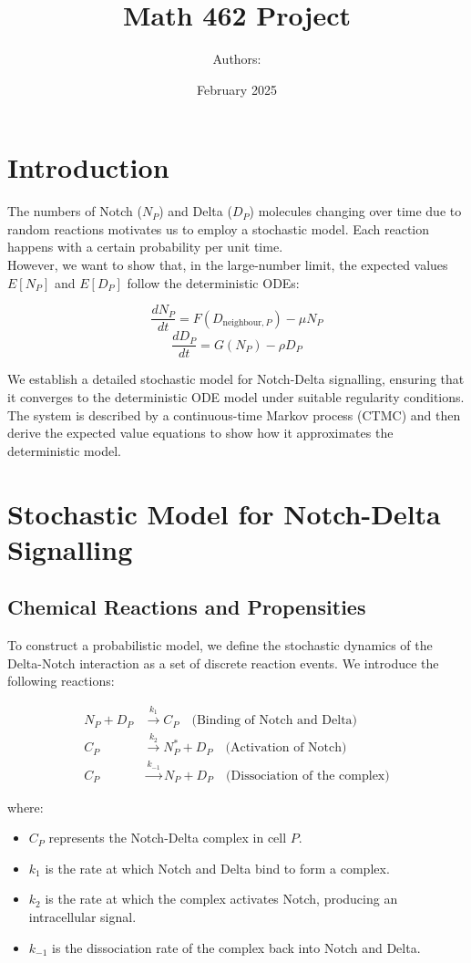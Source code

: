 \documentclass{article}
\title{Math 462 Project}
\author{Authors:}
\date{February 2025}
\begin{document}
\maketitle

\section{Introduction}
The numbers of Notch (\(N_P\)) and Delta (\(D_P\)) molecules changing over time due to random reactions motivates us to employ a stochastic model. Each reaction happens with a certain probability per unit time. \\ 
However, we want to show that, in the large-number limit, the expected values \(E[N_P]\) and \(E[D_P]\) follow the deterministic ODEs:

\[
\frac{dN_P}{dt} = F(D_{\text{neighbour},P}) - \mu N_P
\]
\[
\frac{dD_P}{dt} = G(N_P) - \rho D_P
\]

\hfill

We establish a detailed stochastic model for Notch-Delta signalling, ensuring that it converges to the deterministic ODE model under suitable regularity conditions. The system is described by a continuous-time Markov process (CTMC) and then derive the expected value equations to show how it approximates the deterministic model.

\section{Stochastic Model for Notch-Delta Signalling}
\subsection{Chemical Reactions and Propensities}
To construct a probabilistic model, we define the stochastic dynamics of the Delta-Notch interaction as a set of discrete reaction events. We introduce the following reactions:

\begin{align*}
  N_{P} + D_{P} &\xrightarrow{k_1} C_{P} \quad \text{(Binding of Notch and Delta)} \\
  C_{P} &\xrightarrow{k_2} N_{P}^{*} + D_{P} \quad \text{(Activation of Notch)} \\
  C_{P} &\xrightarrow{k_{-1}} N_{P} + D_{P} \quad \text{(Dissociation of the complex)}
\end{align*}

where:

\begin{itemize}
  \item $C_{P}$ represents the Notch-Delta complex in cell $P$.
  \item $k_1$ is the rate at which Notch and Delta bind to form a complex.
  \item $k_2$ is the rate at which the complex activates Notch, producing an intracellular signal.
  \item $k_{-1}$ is the dissociation rate of the complex back into Notch and Delta.
\end{itemize}
\end{document}
